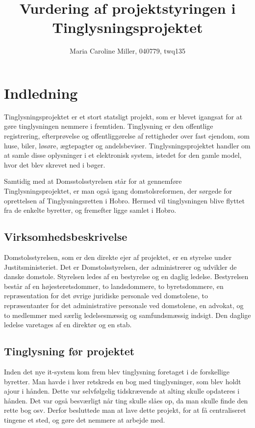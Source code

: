 \documentclass[10pt,a4paper,danish]{article}
\title{Vurdering af projektstyringen i Tinglysningsprojektet}
\author{Maria Caroline Miller, 040779, twq135}
\begin{document}
\maketitle
\newpage

\tableofcontents
\newpage

\section{Indledning}
Tinglysningsprojektet er et stort statsligt projekt, som er blevet igangsat for at gøre tinglysningen nemmere i fremtiden. Tinglysning er den offentlige registrering, efterprøvelse og offentliggørelse af rettigheder over fast ejendom, som huse, biler, løsøre, ægtepagter og andelsbeviser. Tinglysningsprojektet handler om at samle disse oplysninger i et elektronisk system, istedet for den gamle model, hvor det blev skrevet ned i bøger. 

Samtidig med at Domsstolsstyrelsen står for at gennemføre Tinglysningsprojektet, er man også igang domstolsreformen, der sørgede for oprettelsen af Tinglysningsretten i Hobro. Hermed vil tinglysningen blive flyttet fra de enkelte byretter, og fremefter ligge samlet i Hobro. 


\subsection{Virksomhedsbeskrivelse}
Domstolsstyrelsen, som er den direkte ejer af projektet, er en styrelse under Justitsministeriet. Det er Domstolsstyrelsen, der administrerer og udvikler de danske domstole. Styrelsen ledes af en bestyrelse og en daglig ledelse. Bestyrelsen består af en højesteretsdommer, to landsdommere, to byretsdommere, en repræsentation for det øvrige juridiske personale ved domstolene, to repræsentanter for det administrative personale ved domstolene, en advokat, og to medlemmer med særlig ledelsesmæssig og samfundsmæssig indsigt. Den daglige ledelse varetages af en direktør og en stab.

\subsection{Tinglysning før projektet}
Inden det nye it-system kom frem blev tinglysning foretaget i de forskellige byretter. Man havde i hver retskreds en bog med tinglysninger, som blev holdt ajour i hånden. Dette var selvfølgelig tidskrævende at alting skulle opdateres i hånden. Det var også besværligt når ting skulle slåes op, da man skulle finde den rette bog osv. Derfor besluttede man at lave dette projekt, for at få centraliseret tingene et sted, og gøre det nemmere at arbejde med.
\end{document}
